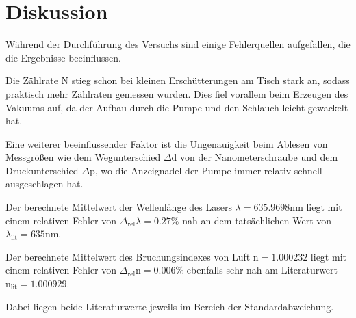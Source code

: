 \section{Diskussion}
\label{sec:Diskussion}
Während der Durchführung des Versuchs sind einige Fehlerquellen aufgefallen, die die Ergebnisse beeinflussen.

\noindent
Die Zählrate N stieg schon bei kleinen Erschütterungen am Tisch stark an, sodass praktisch mehr Zählraten gemessen wurden.
Dies fiel vorallem beim Erzeugen des Vakuums auf, da der Aufbau durch die Pumpe und den Schlauch leicht gewackelt hat.

\noindent
Eine weiterer beeinflussender Faktor ist die Ungenauigkeit beim Ablesen von Messgrößen wie dem Wegunterschied $\Delta \text{d}$ von der Nanometerschraube 
und dem Druckunterschied $\Delta \text{p}$, wo die Anzeignadel der Pumpe immer relativ schnell ausgeschlagen hat.

\noindent
Der berechnete Mittelwert der Wellenlänge des Lasers $\lambda = 635.9698 \si{\nano\meter}$ liegt mit einem relativen Fehler von  $\Delta_\text{rel}\lambda = 0.27\%$ nah an dem tatsächlichen Wert von $\lambda_\text{lit} = 635 \si{\nano\meter}$.


\noindent
Der berechnete Mittelwert des Bruchungsindexes von Luft $\text{n} = 1.000232$ liegt mit einem relativen Fehler von $\Delta_\text{rel} \text{n} = 0.006\%$ ebenfalls sehr nah am Literaturwert $\text{n}_\text{lit} = 1.000929$.

\noindent
Dabei liegen beide Literaturwerte jeweils im Bereich der Standardabweichung.



